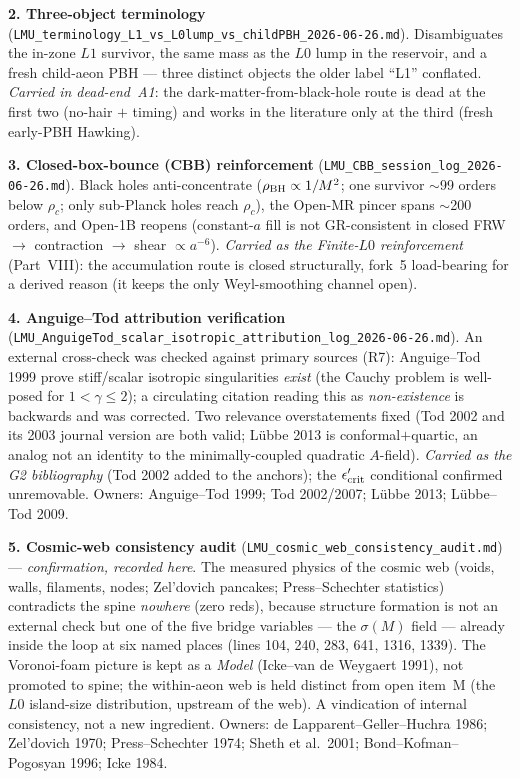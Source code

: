 \documentclass[11pt]{article}
\begin{document}
\smallskip\noindent\textbf{2. Three-object terminology} (\texttt{LMU\_terminology\_L1\_vs\_L0lump\_vs\_childPBH\_2026-06-26.md}). Disambiguates the in-zone $L1$ survivor, the same mass as the $L0$ lump in the reservoir, and a fresh child-aeon PBH --- three distinct objects the older label ``L1'' conflated. \emph{Carried in dead-end~A1}: the dark-matter-from-black-hole route is dead at the first two (no-hair $+$ timing) and works in the literature only at the third (fresh early-PBH Hawking).

\smallskip\noindent\textbf{3. Closed-box-bounce (CBB) reinforcement} (\texttt{LMU\_CBB\_session\_log\_2026-06-26.md}). Black holes anti-concentrate ($\rho_{\rm BH}\propto1/M^2$; one survivor $\sim$99 orders below $\rho_c$; only sub-Planck holes reach $\rho_c$), the Open-MR pincer spans $\sim$200 orders, and Open-1B reopens (constant-$a$ fill is not GR-consistent in closed FRW $\to$ contraction $\to$ shear $\propto a^{-6}$). \emph{Carried as the Finite-$L0$ reinforcement} (Part~VIII): the accumulation route is closed structurally, fork~5 load-bearing for a derived reason (it keeps the only Weyl-smoothing channel open).

\smallskip\noindent\textbf{4. Anguige--Tod attribution verification} (\texttt{LMU\_AnguigeTod\_scalar\_isotropic\_attribution\_log\_2026-06-26.md}). An external cross-check was checked against primary sources (R7): Anguige--Tod 1999 prove stiff/scalar isotropic singularities \emph{exist} (the Cauchy problem is well-posed for $1<\gamma\le2$); a circulating citation reading this as \emph{non-existence} is backwards and was corrected. Two relevance overstatements fixed (Tod 2002 and its 2003 journal version are both valid; Lübbe 2013 is conformal$+$quartic, an analog not an identity to the minimally-coupled quadratic $A$-field). \emph{Carried as the G2 bibliography} (Tod 2002 added to the anchors); the $\epsilon'_{\rm crit}$ conditional confirmed unremovable. Owners: Anguige--Tod 1999; Tod 2002/2007; Lübbe 2013; Lübbe--Tod 2009.

\smallskip\noindent\textbf{5. Cosmic-web consistency audit} (\texttt{LMU\_cosmic\_web\_consistency\_audit.md}) --- \emph{confirmation, recorded here}. The measured physics of the cosmic web (voids, walls, filaments, nodes; Zel'dovich pancakes; Press--Schechter statistics) contradicts the spine \emph{nowhere} (zero reds), because structure formation is not an external check but one of the five bridge variables --- the $\sigma(M)$ field --- already inside the loop at six named places (lines 104, 240, 283, 641, 1316, 1339). The Voronoi-foam picture is kept as a \emph{Model} (Icke--van de Weygaert 1991), not promoted to spine; the within-aeon web is held distinct from open item~M (the $L0$ island-size distribution, upstream of the web). A vindication of internal consistency, not a new ingredient. Owners: de Lapparent--Geller--Huchra 1986; Zel'dovich 1970; Press--Schechter 1974; Sheth et al.\ 2001; Bond--Kofman--Pogosyan 1996; Icke 1984.
\end{document}
